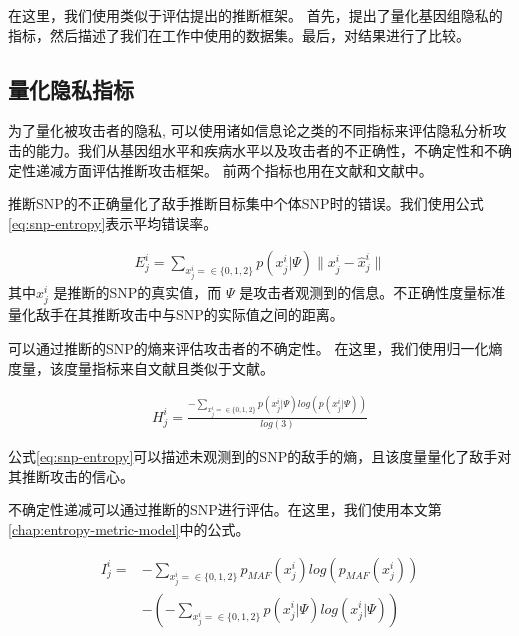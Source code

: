 在这里，我们使用类似于\cite{humbert2013addressing,deznabi2018inference}评估提出的推断框架。 首先，提出了量化基因组隐私的指标，然后描述了我们在工作中使用的数据集。最后，对结果进行了比较。

\subsection{量化隐私指标}

为了量化被攻击者的隐私, 可以使用诸如信息论之类的不同指标来评估隐私分析攻击的能力\cite{marchini2007newa,shokri2011quantifying,serjantov2002towards}。我们从基因组水平和疾病水平以及攻击者的不正确性，不确定性和不确定性递减方面评估推断攻击框架。 前两个指标也用在文献\cite{humbert2013addressing}和文献\cite{deznabi2018inference}中。

推断SNP的不正确量化了敌手推断目标集中个体SNP时的错误。我们使用公式\ref{eq:snp-entropy}表示平均错误率。

\begin{equation}
\begin{aligned}\label{eq:snp-error-rate}
E^i_j=\sum_{x^i_j=\in \{0,1,2\}}{p(x^i_j|\Psi)\|x^i_j - \hat{x}^i_j\|}
\end{aligned}
\end{equation}
其中$x^i_j$ 是推断的SNP的真实值，而 $\Psi$ 是攻击者观测到的信息。不正确性度量标准量化敌手在其推断攻击中与SNP的实际值之间的距离。

可以通过推断的SNP的熵来评估攻击者的不确定性。 在这里，我们使用归一化熵度量，该度量指标来自文献\cite{humbert2013addressing}且类似于文献\cite{deznabi2018inference}。

\begin{equation}
\begin{aligned}\label{eq:snp-entropy}
H^i_j=
\frac{-\sum_{x^i_j=\in \{0,1,2\}}{p(x^i_j|\Psi)log(p(x^i_j|\Psi))}}{log(3)}
\end{aligned}
\end{equation}

公式\ref{eq:snp-entropy}可以描述未观测到的SNP的敌手的熵，且该度量量化了敌手对其推断攻击的信心。

不确定性递减可以通过推断的SNP进行评估。在这里，我们使用本文第\ref{chap:entropy-metric-model}中的公式。

\begin{equation}\label{eq:snp-mutual-information}
\begin{aligned}
I^i_j=& -\sum_{x^i_j=\in \{0,1,2\}}p_{MAF}(x^i_j)log(p_{MAF}(x^i_j))  \nonumber \\
& - (-\sum_{x^i_j=\in \{0,1,2\}}{p(x^i_j|\Psi)log(x^i_j|\Psi)})
\end{aligned}
\end{equation}


